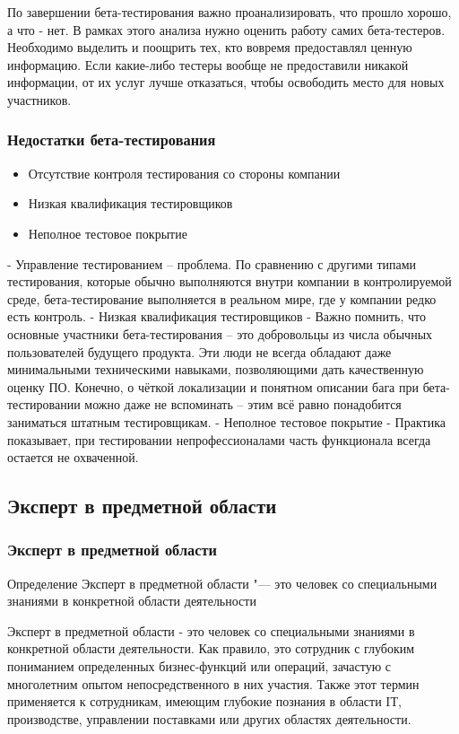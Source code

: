\documentclass{../industrial-development}
\begin{document}
\lecturenotes
По завершении бета-тестирования важно проанализировать, что прошло хорошо, а что - нет. В рамках этого анализа нужно оценить работу самих бета-тестеров. Необходимо выделить и поощрить тех, кто вовремя предоставлял ценную информацию. Если какие-либо тестеры вообще не предоставили никакой информации, от их услуг лучше отказаться, чтобы освободить место для новых участников.

\begin{frame} \frametitle{Недостатки бета-тестирования}
	\begin{itemize}
		\item Отсутствие контроля тестирования со стороны компании
		\item Низкая квалификация тестировщиков
		\item Неполное тестовое покрытие
	\end{itemize}
\end{frame}

\lecturenotes
- Управление тестированием – проблема. По сравнению с другими типами тестирования, которые обычно выполняются внутри компании в контролируемой среде, бета-тестирование выполняется в реальном мире, где у компании редко есть контроль.
- Низкая квалификация тестировщиков - Важно помнить, что основные участники бета-тестирования – это добровольцы из числа обычных пользователей будущего продукта. Эти люди не всегда обладают даже минимальными техническими навыками, позволяющими дать качественную оценку ПО. Конечно, о чёткой локализации и понятном описании бага при бета-тестировании можно даже не вспоминать – этим всё равно понадобится заниматься штатным тестировщикам.
- Неполное тестовое покрытие - Практика показывает, при тестировании непрофессионалами часть функционала всегда остается не охваченной.

\subsection{Эксперт в предметной области}
\begin{frame} \frametitle{Эксперт в предметной области}
	\begin{block}{Определение}
		\alert{Эксперт в предметной области} "--- это человек со специальными знаниями в конкретной области деятельности
	\end{block}
\end{frame}
\lecturenotes
Эксперт в предметной области - это человек со специальными знаниями в конкретной области деятельности. Как правило, это сотрудник с глубоким пониманием определенных бизнес-функций или операций, зачастую с многолетним опытом непосредственного в них участия. Также этот термин применяется к сотрудникам, имеющим глубокие познания в области IТ, производстве, управлении поставками или других областях деятельности.
 
\end{document}

